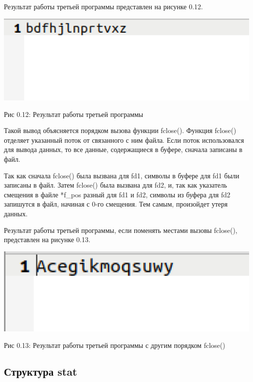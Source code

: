\documentclass[12pt]{report}
\begin{document}
Результат работы третьей программы представлен на рисунке 0.12.

\begin{center}
		\includegraphics[scale=0.5]{pics/Res3.png}
		
			Рис 0.12: Результат работы третьей программы
\end{center}

Такой вывод объясняется порядком вызова функции fclose(). Функция fclose() отделяет указанный поток от связанного с ним файла. Если поток использовался для вывода данных, то все данные, содержащиеся в буфере, сначала записаны в файл. 

Так как сначала fclose() была вызвана для fd1, символы в буфере для fd1 были записаны в файл. Затем fclose() была вызвана для fd2, и, так как указатель смещения в файле *f\_pos разный для fd1 и fd2, символы из буфера для fd2 запишутся в файл, начиная с 0-го смещения. Тем самым, произойдет утеря данных.

Результат работы третьей программы, если поменять местами вызовы fclose(), представлен на рисунке 0.13.

\begin{center}
		\includegraphics[scale=0.55]{pics/Res3_1.png}
		
			Рис 0.13: Результат работы третьей программы с другим порядком fclose()
\end{center}

\subsection{Структура stat}
\end{document}
